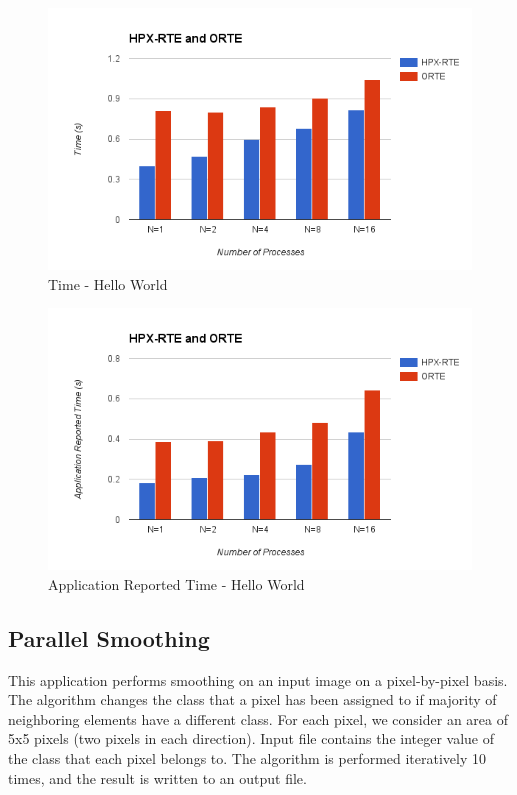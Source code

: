 \begin{figure}[h!]
\centering
\includegraphics[scale=0.7]{images/time-all-hello-world-infiniband.png}
\caption[Time - Hello World]{Time - Hello World}
\label{fig:time-all-hello-world-infiniband}
\end{figure}

\begin{figure}[h!]
\centering
\includegraphics[scale=0.7]{images/time-app-hello-world-infiniband.png}
\caption[Application Reported Time - Hello World]{Application Reported Time - Hello World}
\label{fig:time-app-hello-world-infiniband}
\end{figure}

\clearpage
\subsection{Parallel Smoothing}
This application performs smoothing on an input image on a pixel-by-pixel basis. The algorithm changes the class that a pixel has been assigned to if majority of neighboring elements have a different class. For each pixel, we consider an area of 5x5 pixels (two pixels in each direction). Input file contains the integer value of the class that each pixel belongs to. The algorithm is performed iteratively 10 times, and the result is written to an output file.

